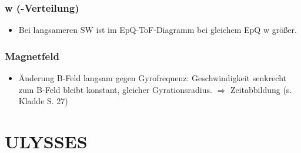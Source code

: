 \documentclass[]{article}
\begin{document}
\subsubsection{w (-Verteilung)}
\begin{itemize}
	\item Bei langsameren SW ist im EpQ-ToF-Diagramm bei gleichem EpQ w größer.
\end{itemize}
%
\subsubsection{Magnetfeld}
\begin{itemize}
	\item Änderung B-Feld langsam gegen Gyrofrequenz: Geschwindigkeit senkrecht zum B-Feld bleibt konstant, gleicher Gyrationsradius. $\Rightarrow$ Zeitabbildung (s. Kladde S. 27) 
\end{itemize}
%
%
%
\newpage
\section{ULYSSES}
\end{document}
